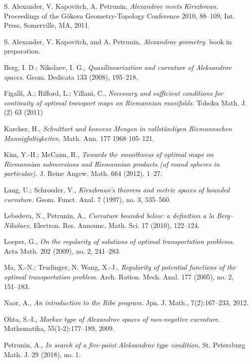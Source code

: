 \documentclass{article}
\begin{document}
\begin{thebibliography}{52}
 S. Alexander, V. Kapovitch, A. Petrunin, 
\emph{Alexandrov meets Kirszbraun.} 
Proceedings of the Gökova Geometry-Topology Conference 2010, 88--109, Int. Press, Somerville, MA, 2011.

 S. Alexander, V. Kapovitch, and A. Petrunin, \emph{Alexandrov geometry.} book in preparation.

 Berg, I. D.; Nikolaev, I. G., \emph{Quasilinearization and curvature of Aleksandrov spaces.} Geom. Dedicata 133 (2008), 195--218.


 Figalli, A.; Rifford, L.; Villani, C.,
\emph{Necessary and sufficient conditions for continuity of optimal transport maps on Riemannian manifolds.} Tohoku Math. J. (2) 63 (2011)

Karcher, H.,
\emph{Schnittort und konvexe Mengen in vollständigen Riemannschen Mannigfaltigkeiten.}
Math. Ann. 177 1968 105--121.

 Kim, Y.-H.; McCann, R.,
\emph{Towards the smoothness of optimal maps on Riemannian submersions and Riemannian products (of round spheres in particular).}
J. Reine Angew. Math. 664 (2012), 1--27. 

  Lang, U.; Schroeder, V.,
\emph{Kirszbraun's theorem and metric spaces of bounded curvature.}
Geom. Funct. Anal. 7 (1997), no. 3, 535–560. 

 Lebedeva, N., Petrunin, A., \emph{Curvature bounded below: a definition a la Berg--Nikolaev.} Electron. Res. Announc. Math. Sci. 17 (2010), 122--124.

Loeper, G.,
\emph{On the regularity of solutions of optimal transportation problems.}
Acta Math. 202 (2009), no. 2, 241–283. 

  Ma, X.-N.; Trudinger, N.  Wang, X.-J.,
\emph{Regularity of potential functions of the optimal transportation problem.}
Arch. Ration. Mech. Anal. 177 (2005), no. 2, 151--183. 

  Naor, A., \emph{An introduction to the Ribe program.} Jpn. J. Math., 7(2):167--233, 2012.

  Ohta, S.-I.,
\emph{Markov type of Alexandrov spaces of non-negative curvature.} Mathematika, 55(1-2):177--189, 2009.

 Petrunin, A., \emph{In search of a five-point Aleksandrov type condition.}  St. Petersburg Math. J. 29 (2018), no. 1.


\end{thebibliography}
\end{document}
